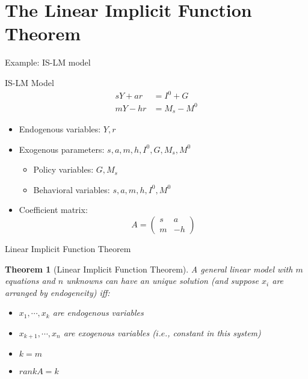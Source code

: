 \documentclass[final]{beamer}
\newtheorem{thm}{Theorem}
\begin{document}
\section{The Linear Implicit Function Theorem} %
\label{sec:the_linear_implicit_function_theorem}
\begin{frame}[t]{Example: IS-LM model}
	\begin{block}
		{IS-LM Model}
		\begin{align*}
			sY + ar &= I^0 + G \tag{IS}\\
			mY - hr &= M_s - M^0 \tag{LM} 
		\end{align*}
	\end{block}
	\begin{itemize}
		\item Endogenous variables: $Y,r$
		\item Exogenous parameters: $s,a,m,h,I^0,G,M_s,M^0$
		\begin{itemize}
			\item Policy variables: $G,M_s$
			\item Behavioral variables: $s,a,m,h,I^0,M^0$
		\end{itemize}
		\item Coefficient matrix:
		\[
			A=\begin{pmatrix}
				s&a\\m&-h
			\end{pmatrix}
		\]
	\end{itemize}
\end{frame}
\begin{frame}[t]{Linear Implicit Function Theorem}
	\begin{thm}
		[Linear Implicit Function Theorem]
		A general linear model with $m$ equations and $n$ unknowns can have an unique solution (and suppose $x_i$ are arranged by endogeneity) iff:
		\begin{itemize}
			\item $x_1,\cdots,x_k$ are endogenous variables
			\item $x_{k+1},\cdots, x_n$ are exogenous variables ($i.e.$, constant in this system)
			\item $k=m$
			\item $rank A = k$
		\end{itemize}
	\end{thm}
\end{frame}
\end{document}
